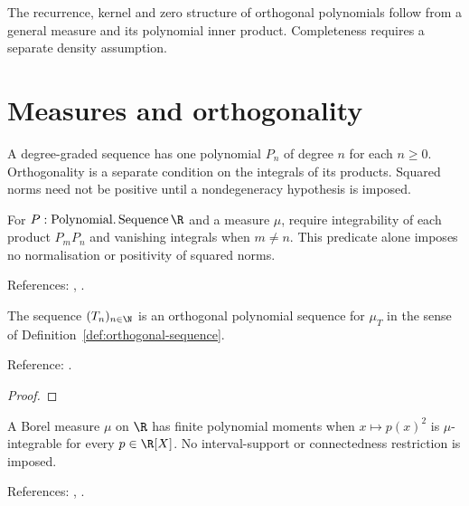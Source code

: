 
The recurrence, kernel and zero structure of orthogonal polynomials follow from a general measure and its polynomial inner product. Completeness requires a separate density assumption.

\section{Measures and orthogonality}\label{sec:textbook-general-measure}

A degree-graded sequence has one polynomial $P_n$ of degree $n$ for each $n\ge0$. Orthogonality is a separate condition on the integrals of its products. Squared norms need not be positive until a nondegeneracy hypothesis is imposed.

\begin{definition}
\label{def:orthogonal-sequence}
\leanok
For $P:\operatorname{Polynomial.Sequence}\R$ and a measure $\mu$, require
integrability of each product $P_mP_n$ and vanishing integrals when $m\ne n$.
This predicate alone imposes no normalisation or positivity of squared norms.

References: \cite[18.2(i)]{dlmf}, \cite[Chapter 3]{szego}.
\end{definition}

\begin{theorem}
\label{thm:T-sequence}
\leanok
The sequence $(T_n)_{n\in\N}$ is an orthogonal polynomial sequence for $\mu_T$
in the sense of Definition~\ref{def:orthogonal-sequence}.

Reference: \cite[Table 18.3.1]{dlmf}.
\end{theorem}
\begin{proof}
\leanok
\end{proof}

\begin{definition}
\label{def:polynomial-moments}
\leanok
A Borel measure $\mu$ on $\R$ has finite polynomial moments when
$x\mapsto p(x)^2$ is $\mu$-integrable for every $p\in\R[X]$.
No interval-support or connectedness restriction is imposed.

References: \cite[18.2(i)]{dlmf}, \cite[Chapter 3]{szego}.
\end{definition}

